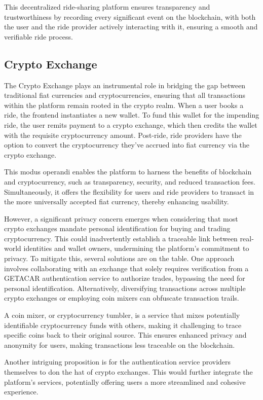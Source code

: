 This decentralized ride-sharing platform ensures transparency and trustworthiness by recording every significant event on the blockchain, with both the user and the ride provider actively interacting with it, ensuring a smooth and verifiable ride process.


\subsection{Crypto Exchange}\label{subsec:CryptoExchange}

The Crypto Exchange plays an instrumental role in bridging the gap between traditional fiat currencies and cryptocurrencies, ensuring that all transactions within the platform remain rooted in the crypto realm. When a user books a ride, the frontend instantiates a new wallet. To fund this wallet for the impending ride, the user remits payment to a crypto exchange, which then credits the wallet with the requisite cryptocurrency amount. Post-ride, ride providers have the option to convert the cryptocurrency they've accrued into fiat currency via the crypto exchange.

This modus operandi enables the platform to harness the benefits of blockchain and cryptocurrency, such as transparency, security, and reduced transaction fees. Simultaneously, it offers the flexibility for users and ride providers to transact in the more universally accepted fiat currency, thereby enhancing usability.

However, a significant privacy concern emerges when considering that most crypto exchanges mandate personal identification for buying and trading cryptocurrency. This could inadvertently establish a traceable link between real-world identities and wallet owners, undermining the platform's commitment to privacy. To mitigate this, several solutions are on the table. One approach involves collaborating with an exchange that solely requires verification from a GETACAR authentication service to authorize trades, bypassing the need for personal identification. Alternatively, diversifying transactions across multiple crypto exchanges or employing coin mixers can obfuscate transaction trails.

A coin mixer, or cryptocurrency tumbler, is a service that mixes potentially identifiable cryptocurrency funds with others, making it challenging to trace specific coins back to their original source. This ensures enhanced privacy and anonymity for users, making transactions less traceable on the blockchain.

Another intriguing proposition is for the authentication service providers themselves to don the hat of crypto exchanges. This would further integrate the platform's services, potentially offering users a more streamlined and cohesive experience.
 